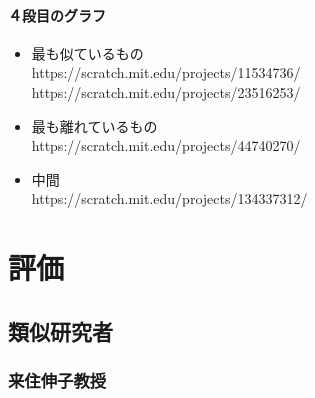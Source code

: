 \documentclass[a4paper,10pt,onecolumn,oneside,openany]{jsbook}
\begin{document}
 \subsubsection{４段目のグラフ}
 \begin{itemize}
\item 最も似ているもの
\\https://scratch.mit.edu/projects/11534736/
\\https://scratch.mit.edu/projects/23516253/
\item 最も離れているもの
\\https://scratch.mit.edu/projects/44740270/
\item 中間
\\https://scratch.mit.edu/projects/134337312/
\end{itemize}



\chapter{評価}

\section{類似研究者}
\subsection{来住伸子教授}
\end{document}
